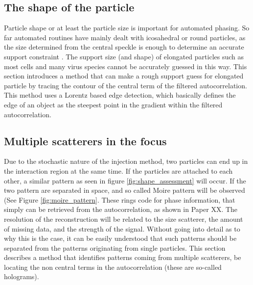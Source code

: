 \subsection{The shape of the particle}
Particle shape or at least the particle size is important for automated phasing. So far automated routines have mainly dealt with icosahedral or round particles, as the size determined from the central speckle is enough to determine an accurate support constraint \cite{Hantke2014,Daurer2017}. The support size (and shape) of elongated particles such as most cells and many virus species cannot be accurately guessed in this way. This section introduces a method that can make a rough support guess for elongated particle by tracing the contour of the central term of the filtered autocorrelation. This method uses a Lorentz based edge detection, which basically defines the edge of an object as the steepest point in the gradient within the filtered autocorrelation.

\subsection{Multiple scatterers in the focus}

Due to the stochastic nature of the injection method, two particles can end up in the interaction region at the same time. If the particles are attached to each other, a similar pattern as seen in figure \ref{fig:shape_assessment} will occur. If the two pattern are separated in space, and so called Moire pattern will be observed (See Figure \ref{fig:moire_pattern}. These rings code for phase information, that simply can be retrieved from the autocorrelation, as shown in Paper XX. The resolution of the reconstruction will be related to the size scatterer, the amount of missing data, and the strength of the signal. Without going into detail as to why this is the case, it can be easily understood that such patterns should be separated from the patterns originating from single particles. This section describes a method that identifies patterns coming from multiple scatterers, be locating the non central terms in the autocorrelation (these are so-called holograms).
